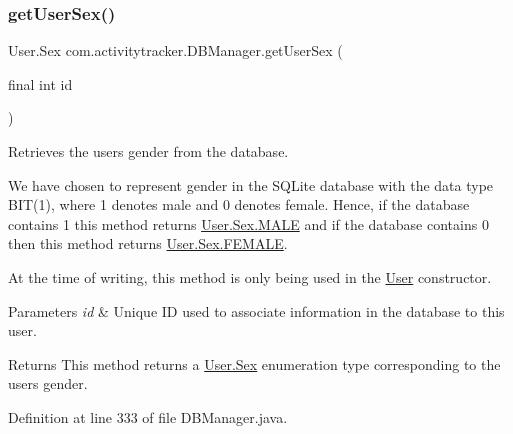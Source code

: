 \subsubsection{\texorpdfstring{get\+User\+Sex()}{getUserSex()}}
{\footnotesize\ttfamily User.\+Sex com.\+activitytracker.\+D\+B\+Manager.\+get\+User\+Sex (\begin{DoxyParamCaption}\item[{final int}]{id }\end{DoxyParamCaption})}

Retrieves the user\textquotesingle{}s gender from the database.

We have chosen to represent gender in the S\+Q\+Lite database with the data type B\+IT(1), where 1 denotes male and 0 denotes female. Hence, if the database contains 1 this method returns \mbox{\hyperlink{enumcom_1_1activitytracker_1_1_user_1_1_sex_ad3b626a38bd4615eb621d75b939f412d}{User.\+Sex.\+M\+A\+LE}} and if the database contains 0 then this method returns \mbox{\hyperlink{enumcom_1_1activitytracker_1_1_user_1_1_sex_a5c22ece8a4df71ed5202cd492990a752}{User.\+Sex.\+F\+E\+M\+A\+LE}}.

At the time of writing, this method is only being used in the \mbox{\hyperlink{classcom_1_1activitytracker_1_1_user}{User}} constructor.


\begin{DoxyParams}{Parameters}
{\em id} & Unique ID used to associate information in the database to this user.\\
\hline
\end{DoxyParams}
\begin{DoxyReturn}{Returns}
This method returns a \mbox{\hyperlink{enumcom_1_1activitytracker_1_1_user_1_1_sex}{User.\+Sex}} enumeration type corresponding to the user\textquotesingle{}s gender. 
\end{DoxyReturn}


Definition at line 333 of file D\+B\+Manager.\+java.


